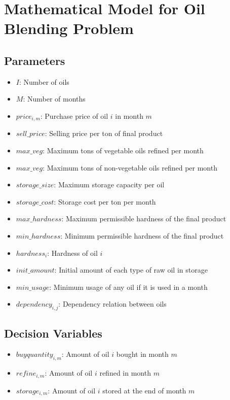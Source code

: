 \documentclass{article}
\begin{document}
\section*{Mathematical Model for Oil Blending Problem}

\subsection*{Parameters}
\begin{itemize}
    \item $I$: Number of oils
    \item $M$: Number of months
    \item $price_{i,m}$: Purchase price of oil $i$ in month $m$
    \item $sell\_price$: Selling price per ton of final product
    \item $max\_veg$: Maximum tons of vegetable oils refined per month
    \item $max\_veg$: Maximum tons of non-vegetable oils refined per month
    \item $storage\_size$: Maximum storage capacity per oil
    \item $storage\_cost$: Storage cost per ton per month
    \item $max\_hardness$: Maximum permissible hardness of the final product
    \item $min\_hardness$: Minimum permissible hardness of the final product
    \item $hardness_{i}$: Hardness of oil $i$
    \item $init\_amount$: Initial amount of each type of raw oil in storage
    \item $min\_usage$: Minimum usage of any oil if it is used in a month
    \item $dependency_{i,j}$: Dependency relation between oils
\end{itemize}

\subsection*{Decision Variables}
\begin{itemize}
    \item $buyquantity_{i,m}$: Amount of oil $i$ bought in month $m$
    \item $refine_{i,m}$: Amount of oil $i$ refined in month $m$
    \item $storage_{i,m}$: Amount of oil $i$ stored at the end of month $m$
\end{itemize}
\end{document}

